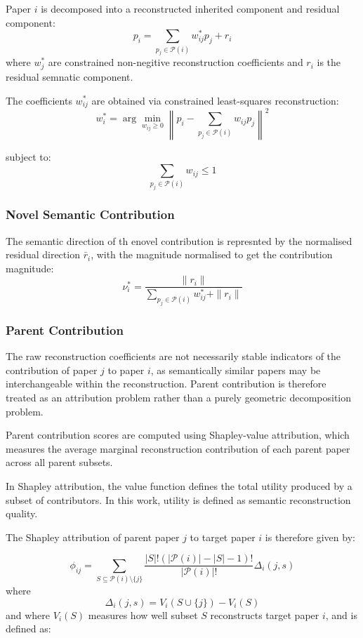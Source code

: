 Paper $i$ is decomposed into a reconstructed inherited component and residual component:
\[p_i = \sum_{p_j \in \mathcal{P} (i)} w_{ij}^* p_j + r_i\]
where $w_j^*$ are constrained non-negitive reconstruction coefficients and $r_i$ is the residual semnatic component.

The coefficients $w_{ij}^*$ are obtained via constrained least-squares reconstruction:
\[w_i^* = \arg \min_{w_{ij}\ge 0} \left \| p_i - \sum_{p_j\in \mathcal{P}(i)}w_{ij} p_j\right \|^2 \]

subject to:
\[\sum_{p_j\in \mathcal{P}(i)}  w_{ij} \le 1\]


\subsubsection*{Novel Semantic Contribution}
The semantic direction of th enovel contribution is represnted by the normalised residual direction $\bar{r}_i$, with the magnitude normalised to get the contribution magnitude:
\begin{equation}
    \nu_i^* = \frac{\|r_i\|}{\sum_{p_j \in \mathcal{P}(i)} w_{ij}^* + \|r_i\|}
\end{equation}

\subsubsection*{Parent Contribution}

The raw reconstruction coefficients are not necessarily stable indicators of the contribution of paper \(j\) to paper \(i\), as semantically similar papers may be interchangeable within the reconstruction. Parent contribution is therefore treated as an attribution problem rather than a purely geometric decomposition problem.

Parent contribution scores are computed using Shapley-value attribution, which measures the average marginal reconstruction contribution of each parent paper across all parent subsets.

In Shapley attribution, the value function defines the total utility produced by a subset of contributors. In this work, utility is defined as semantic reconstruction quality.

The Shapley attribution of parent paper \(j\) to target paper \(i\) is therefore given by:

\begin{equation}
\phi_{ij}
=
\sum_{S\subseteq \mathcal{P}(i)\setminus\{j\}}
\frac{|S|!(|\mathcal{P}(i)|-|S|-1)!}
{|\mathcal{P}(i)|!}
    \Delta_i(j,s)
\end{equation}
where
\begin{equation}
    \Delta_i(j,s) = V_i(S\cup\{j\})-V_i(S)
\end{equation}
and where \(V_i(S)\) measures how well subset \(S\) reconstructs target paper \(i\), and is defined as:

